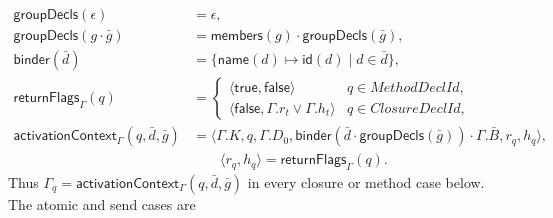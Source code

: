 \begin{equation}\label{eq:elaboration-context-extension}
\begin{aligned}
 \mathsf{groupDecls}(\epsilon)&=\epsilon,\\
 \mathsf{groupDecls}(g\cdot\bar g)&=
     \mathsf{members}(g)\cdot\mathsf{groupDecls}(\bar g),\\
 \mathsf{binder}(\bar d)&=
     \{\mathsf{name}(d)\mapsto\mathsf{id}(d)\mid d\in\bar d\},\\
 \mathsf{returnFlags}_{\Gamma}(q)&=
  \begin{cases}
   \langle\mathsf{true},\mathsf{false}\rangle&q\in\mathit{MethodDeclId},\\
   \langle\mathsf{false},\Gamma.r_t\lor\Gamma.h_t\rangle
       &q\in\mathit{ClosureDeclId},
  \end{cases}\\
 \mathsf{activationContext}_{\Gamma}(q,\bar d,\bar g)&=
   \langle\Gamma.K,q,\Gamma.D_0,
     \mathsf{binder}(\bar d\cdot\mathsf{groupDecls}(\bar g))
       \cdot\Gamma.\bar B,r_q,h_q\rangle,\\[-1mm]
 &\qquad\langle r_q,h_q\rangle=\mathsf{returnFlags}_{\Gamma}(q).
\end{aligned}
\end{equation}
Thus $\Gamma_q=\mathsf{activationContext}_{\Gamma}(q,\bar d,\bar g)$ in every
closure or method case below.  The atomic and send cases are
